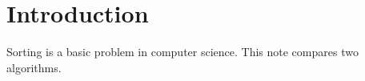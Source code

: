 \section{Introduction}
Sorting is a basic problem in computer science. This note compares two algorithms.
